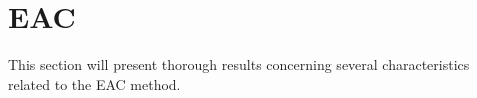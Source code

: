 \section{EAC}
\label{sec:eac results}

This section will present thorough results concerning several characteristics related to the EAC method.










%
%


